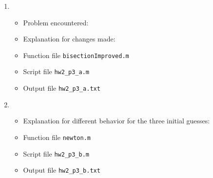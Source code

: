\begin{solution}
  \quad
  \begin{enumerate}
    \item
      \begin{itemize}
        \item Problem encountered:
          \\[25pt]  %
        \item Explanation for changes made:
          \\[25pt]  %
        \item
          Function file \verb|bisectionImproved.m|
          
        \item
          Script file \verb|hw2_p3_a.m|
          
        \item
          Output file \verb|hw2_p3_a.txt|
          
      \end{itemize}
    \item
      \begin{itemize}
        \item Explanation for different behavior for the three initial guesses:
          \\[25pt]  %
        \item
          Function file \verb|newton.m|
          
        \item
          Script file \verb|hw2_p3_b.m|
          
        \item
          Output file \verb|hw2_p3_b.txt|
          
      \end{itemize}
  \end{enumerate}
\end{solution}

